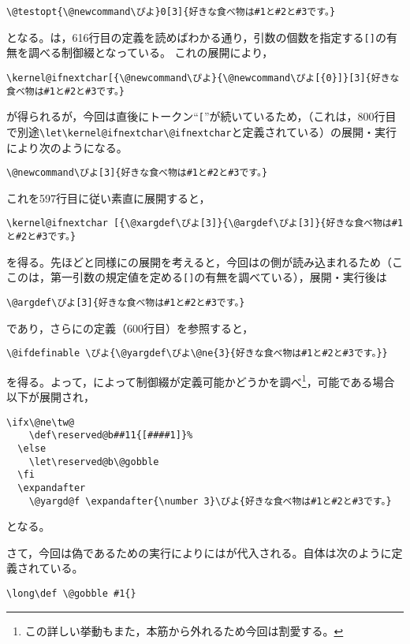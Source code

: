 \documentclass[autodetect-engine,dvipdfmx]{jsarticle}
\begin{document}
\begin{lstlisting}
\@testopt{\@newcommand\ぴよ}0[3]{好きな食べ物は#1と#2と#3です。}
\end{lstlisting}
となる。は，616行目の定義を読めばわかる通り，引数の個数を指定する\texttt{[]}の有無を調べる制御綴となっている。
これの展開により，
\begin{lstlisting}
\kernel@ifnextchar[{\@newcommand\ぴよ}{\@newcommand\ぴよ[{0}]}[3]{好きな食べ物は#1と#2と#3です。}
\end{lstlisting}
が得られるが，今回は直後にトークン``\texttt{[}''が続いているため，（これは，800行目で別途\preSub\verb|\let\kernel@ifnextchar\@ifnextchar|と定義されている）の展開・実行により次のようになる。
\begin{lstlisting}
\@newcommand\ぴよ[3]{好きな食べ物は#1と#2と#3です。}
\end{lstlisting}
これを597行目に従い素直に展開すると，
\begin{lstlisting}
\kernel@ifnextchar [{\@xargdef\ぴよ[3]}{\@argdef\ぴよ[3]}{好きな食べ物は#1と#2と#3です。}
\end{lstlisting}
を得る。先ほどと同様にの展開を考えると，今回は\cmd{\@argdef}の側が読み込まれるため（ここのは，第一引数の規定値を定める\texttt{[]}の有無を調べている），展開・実行後は
\begin{lstlisting}
\@argdef\ぴよ[3]{好きな食べ物は#1と#2と#3です。}
\end{lstlisting}
であり，さらにの定義（600行目）を参照すると，
\begin{lstlisting}
\@ifdefinable \ぴよ{\@yargdef\ぴよ\@ne{3}{好きな食べ物は#1と#2と#3です。}}
\end{lstlisting}
を得る。よって，によって制御綴が定義可能かどうかを調べ\footnote{この詳しい挙動もまた，本筋から外れるため今回は割愛する。}，可能である場合以下が展開され，
\begin{lstlisting}
\ifx\@ne\tw@
    \def\reserved@b##11{[####1]}%
  \else
    \let\reserved@b\@gobble
  \fi
  \expandafter
    \@yargd@f \expandafter{\number 3}\ぴよ{好きな食べ物は#1と#2と#3です。}
\end{lstlisting}
となる。

さて，今回は偽であるための実行によりにはが代入される。自体は次のように定義されている。
\latexltx
\begin{lstlisting}[firstnumber=725]
\long\def \@gobble #1{}
\end{lstlisting}
\end{document}
